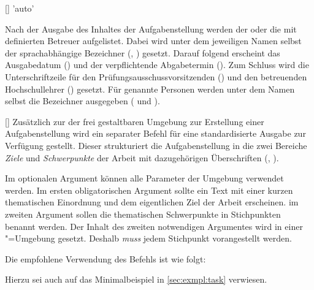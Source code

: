\begin{Bundle*}{}
\begin{Declaration}{[]}{%
  'auto'%
}
\begin{Declaration}{}
Nach der Ausgabe des Inhaltes der Aufgabenstellung werden der oder die mit 
 definierten Betreuer aufgelistet. Dabei wird unter dem 
jeweiligen Namen selbst der sprachabhängige Bezeichner (, 
) gesetzt. Darauf folgend erscheint das Ausgabedatum 
() und der verpflichtende Abgabetermin (). Zum 
Schluss wird die Unterschriftzeile für den Prüfungsausschussvorsitzenden 
() und den betreuenden Hochschullehrer () 
gesetzt. Für genannte Personen werden unter dem Namen selbst die Bezeichner 
ausgegeben ( und ).
\end{Declaration}
\end{Declaration}

\begin{Declaration}{%
  [\LParameter{}]%
}
\printdeclarationlist%
%
Zusätzlich zur der frei gestaltbaren Umgebung  zur Erstellung
einer Aufgabenstellung wird ein separater Befehl für eine standardisierte 
Ausgabe zur Verfügung gestellt. Dieser strukturiert die Aufgabenstellung in die 
zwei Bereiche \emph{Ziele} und \emph{Schwerpunkte} der Arbeit mit dazugehörigen 
Überschriften (, ).

Im optionalen Argument können alle Parameter der Umgebung  
verwendet werden. Im ersten obligatorischen Argument sollte ein Text mit einer 
kurzen thematischen Einordnung und dem eigentlichen Ziel der Arbeit erscheinen. 
im zweiten Argument sollen die thematischen Schwerpunkte in Stichpunkten 
benannt werden. Der Inhalt des zweiten notwendigen Argumentes wird in einer 
"=Umgebung gesetzt. Deshalb \emph{muss} jedem Stichpunkt 
 vorangestellt werden.
\end{Declaration}
%
\begin{Example}
Die empfohlene Verwendung des Befehls  ist wie folgt:
\begin{Code}[escapechar=§]
\end{Code}
Hierzu sei auch auf das Minimalbeispiel in \autoref{sec:exmpl:task} verwiesen.
%
\end{Example}


\end{Bundle*}
